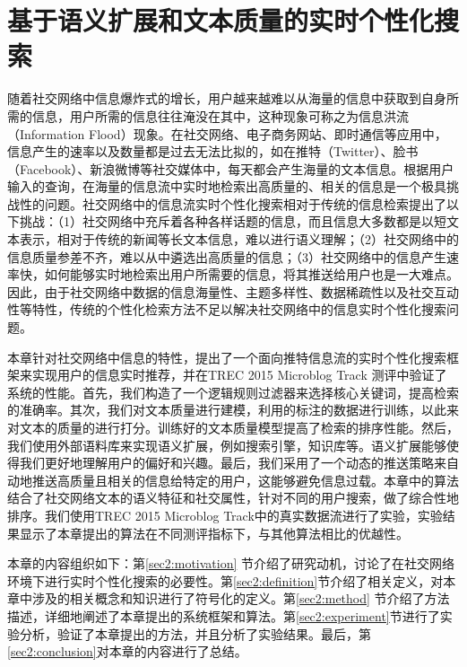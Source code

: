 \chapter{基于语义扩展和文本质量的实时个性化搜索}
\label{chap2:main}
随着社交网络中信息爆炸式的增长，用户越来越难以从海量的信息中获取到自身所需的信息，用户所需的信息往往淹没在其中，这种现象可称之为信息洪流（Information Flood）现象。在社交网络、电子商务网站、即时通信等应用中，信息产生的速率以及数量都是过去无法比拟的，如在推特（Twitter）、脸书（Facebook）、新浪微博等社交媒体中，每天都会产生海量的文本信息。根据用户输入的查询，在海量的信息流中实时地检索出高质量的、相关的信息是一个极具挑战性的问题。社交网络中的信息流实时个性化搜索相对于传统的信息检索提出了以下挑战：（1）社交网络中充斥着各种各样话题的信息，而且信息大多数都是以短文本表示，相对于传统的新闻等长文本信息，难以进行语义理解；（2）社交网络中的信息质量参差不齐，难以从中遴选出高质量的信息；（3）社交网络中的信息产生速率快，如何能够实时地检索出用户所需要的信息，将其推送给用户也是一大难点。因此，由于社交网络中数据的信息海量性、主题多样性、数据稀疏性以及社交互动性等特性，传统的个性化检索方法不足以解决社交网络中的信息实时个性化搜索问题。

本章针对社交网络中信息的特性，提出了一个面向推特信息流的实时个性化搜索框架来实现用户的信息实时推荐，并在TREC 2015 Microblog Track 测评中验证了系统的性能。首先，我们构造了一个逻辑规则过滤器来选择核心关键词，提高检索的准确率。其次，我们对文本质量进行建模，利用的标注的数据进行训练，以此来对文本的质量的进行打分。训练好的文本质量模型提高了检索的排序性能。然后，我们使用外部语料库来实现语义扩展，例如搜索引擎，知识库等。语义扩展能够使得我们更好地理解用户的偏好和兴趣。最后，我们采用了一个动态的推送策略来自动地推送高质量且相关的信息给特定的用户，这能够避免信息过载。本章中的算法结合了社交网络文本的语义特征和社交属性，针对不同的用户搜索，做了综合性地排序。我们使用TREC 2015 Microblog Track中的真实数据流进行了实验，实验结果显示了本章提出的算法在不同测评指标下，与其他算法相比的优越性。

本章的内容组织如下：第\ref{sec2:motivation} 节介绍了研究动机，讨论了在社交网络环境下进行实时个性化搜索的必要性。第\ref{sec2:definition}节介绍了相关定义，对本章中涉及的相关概念和知识进行了符号化的定义。第\ref{sec2:method} 节介绍了方法描述，详细地阐述了本章提出的系统框架和算法。第\ref{sec2:experiment}节进行了实验分析，验证了本章提出的方法，并且分析了实验结果。最后，第\ref{sec2:conclusion}对本章的内容进行了总结。

